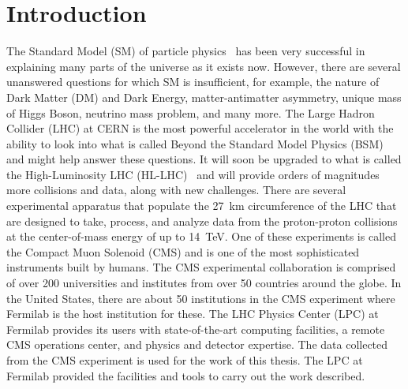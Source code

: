 \chapter{Introduction}

The Standard Model (SM) of particle physics~\cite{What_is_SM} has been very successful in explaining many parts of the universe as it exists now. However, there are several unanswered questions for which SM is insufficient, for example, the nature of Dark Matter (DM) and Dark Energy, matter-antimatter asymmetry, unique mass of Higgs Boson, neutrino mass problem, and many more. The Large Hadron Collider (LHC) \cite{What_is_LHC} at CERN\cite{What_is_CERN} is the most powerful accelerator in the world with the ability to look into what is called Beyond the Standard Model Physics (BSM) and might help answer these questions. It will soon be upgraded to what is called the High-Luminosity LHC (HL-LHC)~\cite{hl-lhc} and will provide orders of magnitudes more collisions and data, along with new challenges. There are several experimental apparatus that populate the 27~\unit{km} circumference of the LHC that are designed to take, process, and analyze data from the proton-proton collisions at the center-of-mass energy of up to 14~\unit{TeV}.
One of these experiments is called the Compact Muon Solenoid (CMS) \cite{CMS_detector} and is one of the most sophisticated instruments built by humans. The CMS experimental collaboration is comprised of over 200 universities and institutes from over 50 countries around the globe. In the United States, there are about 50 institutions in the CMS experiment where Fermilab is the host institution for these. The LHC Physics Center (LPC) at Fermilab provides its users with state-of-the-art computing facilities, a remote CMS operations center, and physics and detector expertise.
The data collected from the CMS experiment is used for the work of this thesis. The LPC at Fermilab provided the facilities and tools to carry out the work described.

